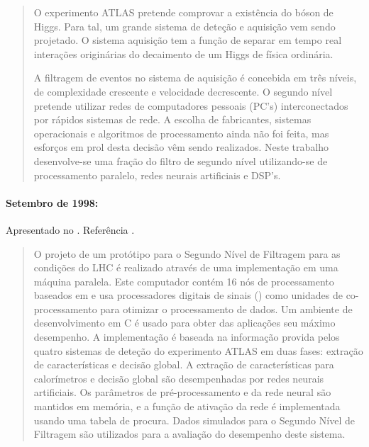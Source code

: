 \begin{quotation}
O experimento ATLAS pretende comprovar a existência do bóson de Higgs. Para
tal, um grande sistema de deteção e aquisição vem sendo projetado. O sistema
aquisição tem a função de separar em tempo real interações originárias do
decaimento de um Higgs de física ordinária.

A filtragem de eventos no sistema de aquisição é concebida em três níveis, de
complexidade crescente e velocidade decrescente. O segundo nível pretende
utilizar redes de computadores pessoais (PC's) interconectados por rápidos
sistemas de rede. A escolha de fabricantes, sistemas operacionais e algoritmos
de processamento ainda não foi feita, mas esforços em prol desta decisão vêm
sendo realizados. Neste trabalho desenvolve-se uma fração do filtro de segundo
nível utilizando-se de processamento paralelo, redes neurais artificiais e
DSP's.
\end{quotation}

\paragraph{Setembro de 1998: } Apresentado no . Referência
\cite{aa:vecpar-1998}.

\begin{quotation}
O projeto de um protótipo para o Segundo Nível de Filtragem para as condições
do LHC é realizado através de uma implementação em uma máquina paralela. Este
computador contém 16 nós de processamento baseados em  e usa
processadores digitais de sinais () como unidades de
co-processamento para otimizar o processamento de dados. Um ambiente de
desenvolvimento em C é usado para obter das aplicações seu máximo
desempenho. A implementação é baseada na informação provida pelos quatro
sistemas de deteção do experimento ATLAS em duas fases: extração de
características e decisão global. A extração de características para
calorímetros e decisão global são desempenhadas por redes neurais
artificiais. Os parâmetros de pré-processamento e da rede neural são mantidos
em memória, e a função de ativação da rede é implementada usando uma tabela de
procura. Dados simulados para o Segundo Nível de Filtragem são utilizados para
a avaliação do desempenho deste sistema.
\end{quotation}

